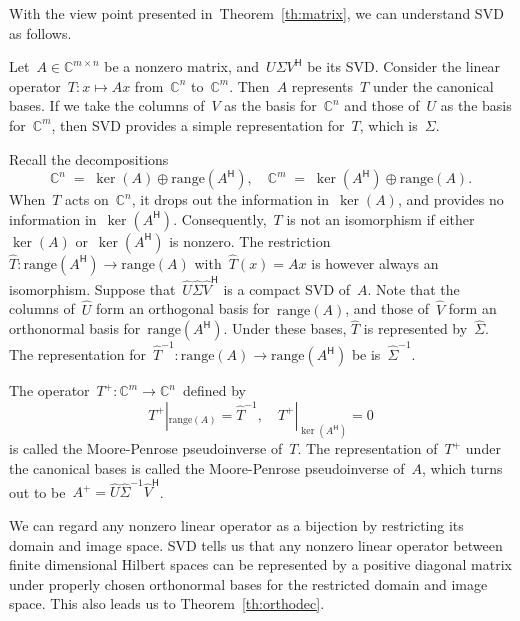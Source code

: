 \documentclass[11pt,a4paper]{article}
\theoremstyle{definition}
\def\CC{\mathbb{C}}
\newcommand{\hmt}{{\scriptscriptstyle{{\mathsf{H}}}}}
\newcommand{\pin}{{\scriptscriptstyle{{\mathsf{+}}}}}
\newcommand{\inv}{{-1}}
\newcommand{\range}{\mathrm{range}}
\begin{document}
With the view point presented in~Theorem~\ref{th:matrix}, we can understand SVD as follows.

Let~$A\in \CC^{m\times n}$ be a nonzero matrix, and~$U\Sigma V^\hmt$ be its SVD. 
Consider the linear operator~$T \mathrel{:} x \mapsto A x$ from~$\CC^{n}$ to~$\CC^{m}$.
Then~$A$ represents~$T$ under the canonical bases. If we take the columns of~$V$ as the basis
for~$\CC^{n}$ and those of~$U$ as the basis for~$\CC^{m}$, then SVD provides a simple
representation for~$T$, which is~$\Sigma$.


Recall the decompositions
\begin{equation*}
\CC^{n} \;=\; \ker(A) \oplus \range(A^\hmt), 
\quad 
\CC^{m} \;=\; \ker(A^\hmt) \oplus \range(A). 
\end{equation*}
When~$T$ acts on~$\CC^{n}$, it drops out the information in~$\ker(A)$, and provides no information
in~$\ker(A^\hmt)$.  Consequently,~$T$ is not an isomorphism if either~$\ker(A)$ or~$\ker(A^\hmt)$ 
is nonzero.  
The restriction~$\hat{T} \mathrel{:} \range(A^\hmt)\to\range(A)$ with~$\hat{T} (x) =Ax$ is however 
always an isomorphism. 
Suppose that~$\hat{U}\hat{\Sigma} \hat{V}^\hmt$ is a compact SVD of~$A$. 
Note that the columns of~$\hat{U}$ form an orthogonal basis
for~$\range(A)$, and those of~$\hat{V}$ form an orthonormal basis for~$\range(A^\hmt)$.  
Under these bases, $\hat{T}$ is represented by~$\hat{\Sigma}$.
The representation for~$\hat{T}^\inv\mathrel{:} \range(A)\to \range(A^\hmt)$ be 
is~$\hat{\Sigma}^\inv$.  

The operator~$T^\pin \mathrel{:} \CC^{m}\to \CC^{n}$~defined by%
\[
T^\pin|_{\range(A)} = \hat{T}^\inv, \quad 
T^\pin|_{\ker(A^\hmt)} = 0
\]
is called the Moore-Penrose pseudoinverse of~$T$. 
The representation 
of~$T^\pin$ under the canonical bases is called the Moore-Penrose pseudoinverse of~$A$, which turns 
out to be~$A^\pin = \hat{U}\hat{\Sigma}^\inv\hat{V}^\hmt$.

We can regard any nonzero linear operator as a bijection by restricting its domain and image
space.
SVD tells us that any nonzero linear operator between finite dimensional Hilbert spaces
can be represented by a positive diagonal matrix under properly chosen orthonormal bases for the
restricted domain and image space. This also leads us to Theorem~\ref{th:orthodec}. 
\end{document}

